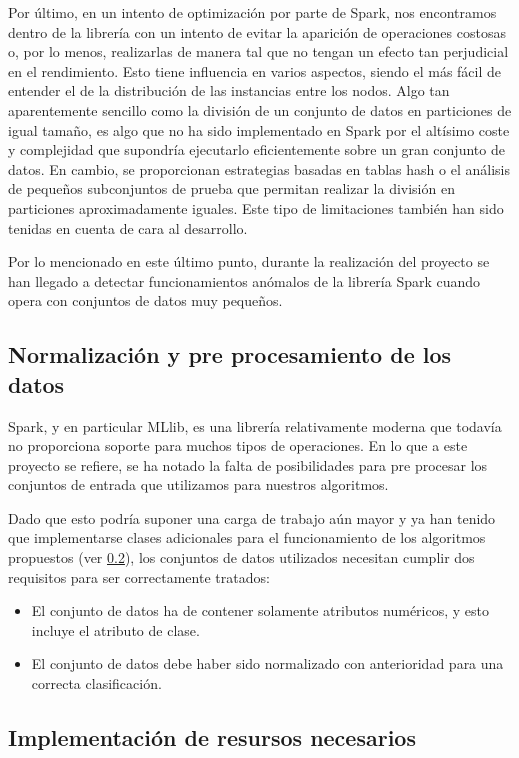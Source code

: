 Por último, en un intento de optimización por parte de Spark, nos encontramos dentro de la librería con un intento de evitar la aparición de operaciones costosas o, por lo menos, realizarlas de manera tal que no tengan un efecto tan perjudicial en el rendimiento. Esto tiene influencia en varios aspectos, siendo el más fácil de entender el de la distribución de las instancias entre los nodos. Algo tan aparentemente sencillo como la división de un conjunto de datos en particiones de igual tamaño, es algo que no ha sido implementado en Spark por el altísimo coste y complejidad que supondría ejecutarlo eficientemente sobre un gran conjunto de datos. En cambio, se proporcionan estrategias basadas en tablas hash o el análisis de pequeños subconjuntos de prueba que permitan realizar la división en particiones aproximadamente iguales. Este tipo de limitaciones también han sido tenidas en cuenta de cara al desarrollo.

Por lo mencionado en este último punto, durante la realización del proyecto se han llegado a detectar funcionamientos anómalos de la librería Spark cuando opera con conjuntos de datos muy pequeños. 

\subsection{Normalización y pre procesamiento de los datos}

Spark, y en particular MLlib, es una librería relativamente moderna que todavía no proporciona soporte para muchos tipos de operaciones. En lo que a este proyecto se refiere, se ha notado la falta de posibilidades para pre procesar los conjuntos de entrada que utilizamos para nuestros algoritmos.

Dado que esto podría suponer una carga de trabajo aún mayor y ya han tenido que implementarse clases adicionales para el funcionamiento de los algoritmos propuestos (ver \ref{sec:ImplRecursosAdicionales}), los conjuntos de datos utilizados necesitan cumplir dos requisitos para ser correctamente tratados:

\begin{itemize}
\item El conjunto de datos ha de contener solamente atributos numéricos, y esto incluye el atributo de clase.
\item El conjunto de datos debe haber sido normalizado con anterioridad para una correcta clasificación.
\end{itemize}

\subsection{Implementación de resursos necesarios}\label{sec:ImplRecursosAdicionales}

